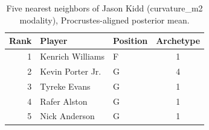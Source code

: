 \begin{table}[htbp]
  \centering\small
  \begin{tabular}{rllc}
    \toprule
    Rank & Player & Position & Archetype \\
    \midrule
    1 & Kenrich Williams & F & 1 \\
    2 & Kevin Porter Jr. & G & 4 \\
    3 & Tyreke Evans & G & 1 \\
    4 & Rafer Alston & G & 1 \\
    5 & Nick Anderson & G & 1 \\
    \bottomrule
  \end{tabular}
  \caption{Five nearest neighbors of Jason Kidd (curvature_m2 modality), Procrustes-aligned posterior mean.}
  \label{tab:Jason_Kidd_neighbors_curvature_m2}
\end{table}

